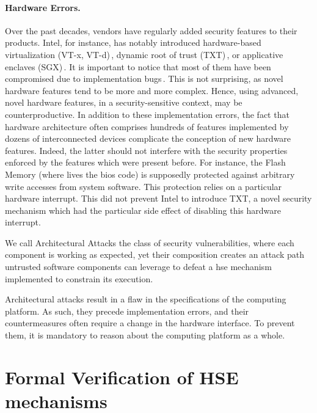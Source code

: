 \paragraph{Hardware Errors.}
%
Over the past decades, vendors have regularly added security features to their
products.
%
Intel, for instance, has notably introduced hardware-based virtualization (VT-x,
VT-d)\,\cite{intel2014manualvt}, dynamic root of trust
(TXT)\,\cite{intel2015txt}, or applicative enclaves
(SGX)\,\cite{intel2014manualsgx,costan2016sgxexplained}.
%
It is important to notice that most of them have been compromised due to
implementation bugs\,\cite{wojtczuk2011txtbug,sang2010iommu}.
%
This is not surprising, as novel hardware features tend to be more and more
complex.
%
Hence, using advanced, novel hardware features, in a security-sensitive context,
may be counterproductive.
%
In addition to these implementation errors, the fact that hardware architecture
often comprises hundreds of features implemented by dozens of interconnected
devices complicate the conception of new hardware features.
%
Indeed, the latter should not interfere with the security properties enforced by
the features which were present before.
%
For instance, the Flash Memory (where lives the \ac{bios} code) is supposedly
protected against arbitrary write accesses from system software.
%
This protection relies on a particular hardware interrupt.
%
This did not prevent Intel to introduce TXT, a novel security mechanism which
had the particular side effect of disabling this hardware interrupt.

\begin{definition}
  We call Architectural Attacks the class of security vulnerabilities, where
  each component is working as expected, yet their composition creates an attack
  path untrusted software components can leverage to defeat a \ac{hse} mechanism
  implemented to constrain its execution.
\end{definition}

Architectural attacks result in a flaw in the specifications of the computing
platform.
%
As such, they precede implementation errors, and their countermeasures often
require a change in the hardware interface.
%
To prevent them, it is mandatory to reason about the computing platform as a
whole.

\section{Formal Verification of HSE mechanisms}
\label{sec:intro:verif}

